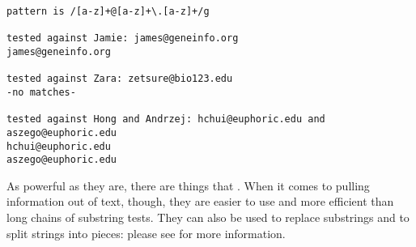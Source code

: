 \begin{verbatim}
pattern is /[a-z]+@[a-z]+\.[a-z]+/g

tested against Jamie: james@geneinfo.org
james@geneinfo.org

tested against Zara: zetsure@bio123.edu
-no matches-

tested against Hong and Andrzej: hchui@euphoric.edu and aszego@euphoric.edu
hchui@euphoric.edu
aszego@euphoric.edu
\end{verbatim}

As powerful as they are,
there are things that .
When it comes to pulling information out of text,
though,
they are easier to use and more efficient than long chains of substring tests.
They can also be used to replace substrings and to split strings into pieces:
please see  for more information.
